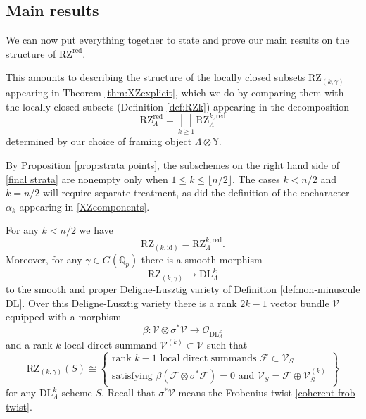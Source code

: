 \documentclass[11pt]{alggeom}
\newcommand{\iso}{\cong}
\newcommand{\red}{\mathrm{red}}
\newcommand{\Q}{\mathbb Q}
\newcommand{\co}{\mathcal O}
\begin{document}

\subsection{Main results}
\label{ss:main}


We can now put everything together to state and prove our main results on the structure of $\mathrm{RZ}^\red$.



This amounts to describing the structure of the locally closed subsets $\mathrm{RZ}_{(k,\gamma)}$ appearing in  Theorem \ref{thm:XZexplicit}, which we do by comparing them with the locally closed subsets (Definition \ref{def:RZk}) appearing in the decomposition
\begin{equation}\label{final strata}
 \mathrm{RZ}_\Lambda^\red = \bigsqcup_{k\ge 1} \mathrm{RZ}_\Lambda^{k,\red}
\end{equation}
determined by our choice of framing object $\Lambda \otimes \overline{\mathbb{Y}}$.

By Proposition \ref{prop:strata points}, the subschemes on the right hand side of \eqref{final strata} are nonempty only when $1\le k \le \lfloor n/2\rfloor$.
The cases $k<n/2$ and $k=n/2$ will require separate treatment, as did the definition   of the cocharacter $\alpha_k$ appearing in \eqref{XZcomponents}.




\begin{theorem}\label{thm:main components}
For  any $k<n/2$ we have
\[
\mathrm{RZ}_{(k,\mathrm{id})} = \mathrm{RZ}_\Lambda^{k,\red} .
\]
Moreover, 
for any $\gamma \in G(\Q_p)$ there is a smooth morphism 
\[
\mathrm{RZ}_{(k,\gamma)} \to \mathrm{DL}_\Lambda^k
\]
to the smooth and proper Deligne-Lusztig variety of Definition \ref{def:non-minuscule DL}.
Over this Deligne-Lusztig variety there is a rank $2k-1$ vector bundle $\mathscr{V}$   equipped with a   morphism
\[
\beta : \mathscr{V} \otimes \sigma^*\mathscr{V} \to \co_{\mathrm{DL}_\Lambda^k}
\]
 and a rank $k$ local direct summand $ \mathscr{V}^{(k)} \subset \mathscr{V}$  such that
 \[
\mathrm{RZ}_{(k,\gamma)}(S)  \iso
\left\{  
\begin{array}{c} 
 \mbox{rank $k-1$ local direct summands } 
 \mathscr{F} \subset \mathscr{V}_S   \\
 \mbox{satisfying }   \beta (\mathscr{F} \otimes \sigma^*\mathscr{F}) =0 
\mbox{ and } \mathscr{V}_S =  \mathscr{F} \oplus \mathscr{V}^{(k)}_S
  \end{array}  \right\} 
\]
 for any $\mathrm{DL}_\Lambda^k$-scheme $S$.
Recall that $\sigma^*\mathscr{V}$ means the Frobenius twist \eqref{coherent frob twist}.
\end{theorem}
\end{document}
